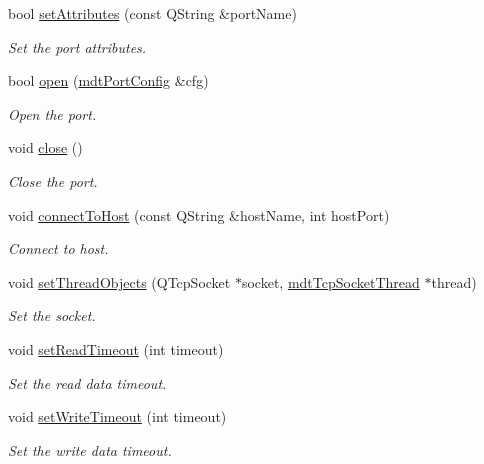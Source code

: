 \begin{DoxyCompactItemize}
\item 
bool \hyperlink{classmdt_tcp_socket_a22ba9c4826e8c45d6cfcd676be48a303}{setAttributes} (const QString \&portName)
\begin{DoxyCompactList}\small\item\em Set the port attributes. \end{DoxyCompactList}\item 
bool \hyperlink{classmdt_tcp_socket_aca164cd2f0b47988291afb7fbb423648}{open} (\hyperlink{classmdt_port_config}{mdtPortConfig} \&cfg)
\begin{DoxyCompactList}\small\item\em Open the port. \end{DoxyCompactList}\item 
void \hyperlink{classmdt_tcp_socket_a7fd4aec4bc5e3e17034f0ec6647af1e8}{close} ()
\begin{DoxyCompactList}\small\item\em Close the port. \end{DoxyCompactList}\item 
void \hyperlink{classmdt_tcp_socket_aa5b229a668c0d9b083f8eec8efe4636f}{connectToHost} (const QString \&hostName, int hostPort)
\begin{DoxyCompactList}\small\item\em Connect to host. \end{DoxyCompactList}\item 
void \hyperlink{classmdt_tcp_socket_a8a57e4b49f56c301c5f8d7a9ec191e87}{setThreadObjects} (QTcpSocket $\ast$socket, \hyperlink{classmdt_tcp_socket_thread}{mdtTcpSocketThread} $\ast$thread)
\begin{DoxyCompactList}\small\item\em Set the socket. \end{DoxyCompactList}\item 
void \hyperlink{classmdt_tcp_socket_aae23057f2e0ee326d0fee78ffe3f00f9}{setReadTimeout} (int timeout)
\begin{DoxyCompactList}\small\item\em Set the read data timeout. \end{DoxyCompactList}\item 
void \hyperlink{classmdt_tcp_socket_ac59d2dfdf405b5382f0f20d5b9f75fd0}{setWriteTimeout} (int timeout)
\begin{DoxyCompactList}\small\item\em Set the write data timeout. \end{DoxyCompactList}\item 

\end{DoxyCompactItemize}
